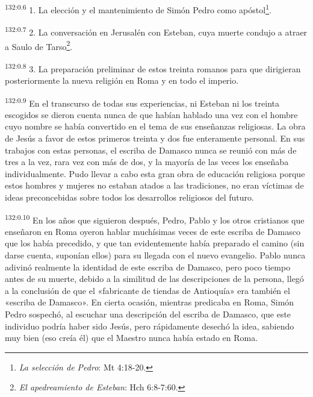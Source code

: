 \par
\textsuperscript{132:0.6} 1. La elección y el mantenimiento de Simón Pedro como apóstol\footnote{\textit{La selección de Pedro}: Mt 4:18-20.}.

\par
\textsuperscript{132:0.7} 2. La conversación en Jerusalén con Esteban, cuya muerte condujo a atraer a Saulo de Tarso\footnote{\textit{El apedreamiento de Esteban}: Hch 6:8-7:60.}.

\par
\textsuperscript{132:0.8} 3. La preparación preliminar de estos treinta romanos para que dirigieran posteriormente la nueva religión en Roma y en todo el imperio.

\par
\textsuperscript{132:0.9} En el transcurso de todas sus experiencias, ni Esteban ni los treinta escogidos se dieron cuenta nunca de que habían hablado una vez con el hombre cuyo nombre se había convertido en el tema de sus enseñanzas religiosas. La obra de Jesús a favor de estos primeros treinta y dos fue enteramente personal. En sus trabajos con estas personas, el escriba de Damasco nunca se reunió con más de tres a la vez, rara vez con más de dos, y la mayoría de las veces los enseñaba individualmente. Pudo llevar a cabo esta gran obra de educación religiosa porque estos hombres y mujeres no estaban atados a las tradiciones, no eran víctimas de ideas preconcebidas sobre todos los desarrollos religiosos del futuro.

\par
\textsuperscript{132:0.10} En los años que siguieron después, Pedro, Pablo y los otros cristianos que enseñaron en Roma oyeron hablar muchísimas veces de este escriba de Damasco que los había precedido, y que tan evidentemente había preparado el camino (sin darse cuenta, suponían ellos) para su llegada con el nuevo evangelio. Pablo nunca adivinó realmente la identidad de este escriba de Damasco, pero poco tiempo antes de su muerte, debido a la similitud de las descripciones de la persona, llegó a la conclusión de que el «fabricante de tiendas de Antioquía» era también el «escriba de Damasco». En cierta ocasión, mientras predicaba en Roma, Simón Pedro sospechó, al escuchar una descripción del escriba de Damasco, que este individuo podría haber sido Jesús, pero rápidamente desechó la idea, sabiendo muy bien (eso creía él) que el Maestro nunca había estado en Roma.

